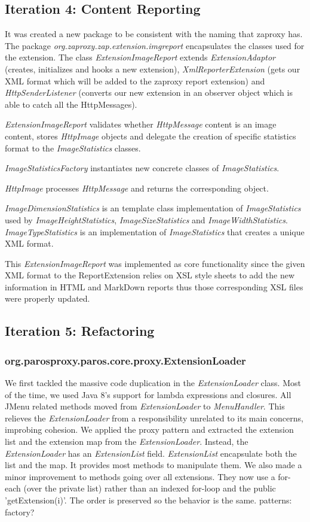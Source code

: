 \subsection{Iteration 4: Content Reporting}
It was created a new package to be consistent with the naming that zaproxy has. The package \textit{org.zaproxy.zap.extension.imgreport} encapsulates the classes used for the extension. The class \textit{ExtensionImageReport} extends \textit{ExtensionAdaptor} (creates, initializes and hooks a new extension), \textit{XmlReporterExtension} (gets our XML format which will be added to the zaproxy report extension) and \textit{HttpSenderListener} (converts our new extension in an observer object which is able to catch all the HttpMessages).
\par
\textit{ExtensionImageReport} validates whether \textit{HttpMessage} content is an image content, stores \textit{HttpImage} objects and delegate the creation of specific statistics format to the \textit{ImageStatistics} classes. 
\par
\textit{ImageStatisticsFactory} instantiates new concrete classes of \textit{ImageStatistics}.
\par
\textit{HttpImage} processes \textit{HttpMessage} and returns the corresponding object.
\par
\textit{ImageDimensionStatistics} is an template class implementation of \textit{ImageStatistics} used by \textit{ImageHeightStatistics}, \textit{ImageSizeStatistics} and \textit{ImageWidthStatistics}. \textit{ImageTypeStatistics} is an implementation of \textit{ImageStatistics} that creates a unique XML format.
\par
This \textit{ExtensionImageReport} was implemented as core functionality since the given XML format to the ReportExtension relies on XSL style sheets to add the new information in HTML and MarkDown reports thus those corresponding XSL files were properly updated.

\subsection{Iteration 5: Refactoring}
\subsubsection{org.parosproxy.paros.core.proxy.ExtensionLoader}
We first tackled the massive code duplication in  the \textit{ExtensionLoader} class. Most of the time, we used Java 8's support for lambda expressions and closures.
All JMenu related methods moved from \textit{ExtensionLoader} to \textit{MenuHandler}. This relieves the \textit{ExtensionLoader} from a responsibility unrelated to its main concerns, improbing cohesion.
We applied the proxy pattern and extracted the extension list and the extension map from the \textit{ExtensionLoader}. Instead, the \textit{ExtensionLoader} has an \textit{ExtensionList} field. \textit{ExtensionList} encapsulate both the list and the map. It provides most methods to manipulate them.
We also made a minor improvement to methods going over all extensions. They now use a for-each (over the private list) rather than an indexed for-loop and the public 'getExtension(i)'. The order is preserved so the behavior is the same.
patterns: factory?
